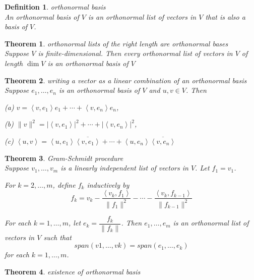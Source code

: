 \documentclass{article}
\newtheorem{theorem}{Theorem}[subsection]
\newtheorem{definition}{Definition}[subsection]
\begin{document}
\begin{CJK}{UTF8}{gkai}
\begin{definition}
    orthonormal basis\\

    An orthonormal basis of $V$ is an orthonormal list of vectors in $V$ that is also a basis of $V$.
\end{definition}

\begin{theorem}
    orthonormal lists of the right length are orthonormal bases\\

    Suppose $V$ is finite-dimensional. Then every orthonormal list of vectors in $V$ of length $\dim V$ is an orthonormal basis of $V$
\end{theorem}

\begin{theorem}
    writing a vector as a linear combination of an orthonormal basis\\

    Suppose $e_1,\ldots,e_n$ is an orthonormal basis of $V$ and $u,v \in V$. Then

    (a) $v = \left<v,e_1\right>e_1 + \cdots+\left<v,e_n\right>e_n$,

    (b) $\|v\|^2 = |\left<v,e_1\right>|^2 + \cdots + |\left<v,e_n\right>|^2$,

    (c) $\left<u,v\right> = \left<u,e_1\right>\overline{\left<v,e_1\right>} + \cdots + \left<u,e_n\right>\overline{\left<v,e_n\right>}$
\end{theorem}

\begin{theorem}
    Gram-Schmidt procedure\\

    Suppose $v_1,\ldots,v_m$ is a linearly independent list of vectors in $V$. Let $f_1 = v_1$.

    For $k = 2,\ldots,m$, define $f_k$ inductively by
    \[f_k = v_k - \dfrac{\left<v_k, f_1\right>}{ \| f_1\|^2 } - \cdots - \dfrac{\left<v_{k}, f_{k-1}\right>}{\| f_{k - 1}\|^2}\]

    For each $k = 1,\ldots,m$, let $e_k = \dfrac{f_k}{\| f_k\|}$. Then $e_1,\ldots,e_m$ is an orthonormal list of vectors in $V$ such that
    \[span(v1,\ldots,vk) = span(e_1,\ldots,e_k)\]
    for each $k = 1,\ldots,m$.
\end{theorem}

\begin{theorem}
    existence of orthonormal basis\\


\end{theorem}
\end{CJK}
\end{document}

